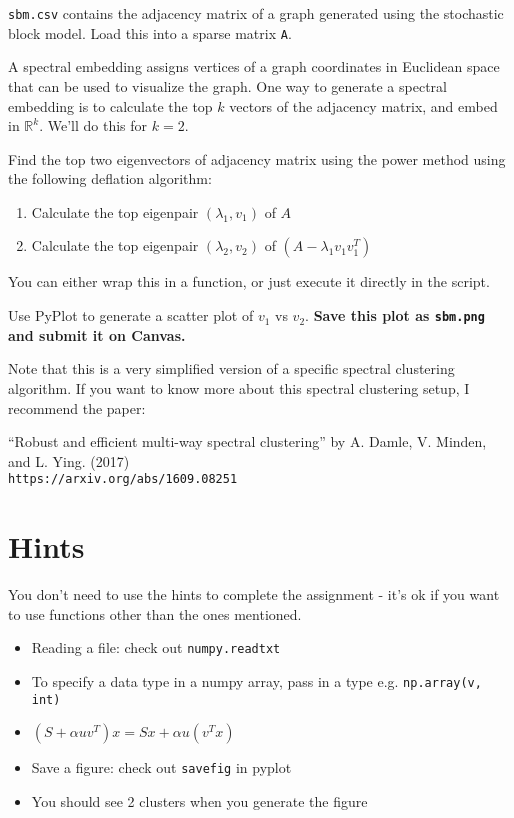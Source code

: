 \documentclass{article}
\begin{document}
{\tt sbm.csv} contains the adjacency matrix of a graph generated using the stochastic block model.  Load this into a sparse matrix {\tt A}.

A spectral embedding assigns vertices of a graph coordinates in Euclidean space that can be used to visualize the graph.  One way to generate a spectral embedding is to calculate the top $k$ vectors of the adjacency matrix, and embed in $\mathbb{R}^k$.  We'll do this for $k=2$.

Find the top two eigenvectors of adjacency matrix using the power method using the following deflation algorithm:
\begin{enumerate}
\item Calculate the top eigenpair $(\lambda_1, v_1)$ of $A$
\item Calculate the top eigenpair $(\lambda_2, v_2)$ of $(A - \lambda_1 v_1 v_1^T)$
\end{enumerate}
You can either wrap this in a function, or just execute it directly in the script.

Use PyPlot to generate a scatter plot of $v_1$ vs $v_2$.  {\bf Save this plot as {\tt sbm.png} and submit it on Canvas.}

Note that this is a very simplified version of a specific spectral clustering algorithm.  If you want to know more about this spectral clustering setup, I recommend the paper:

``Robust and efficient multi-way spectral clustering'' by A. Damle, V. Minden, and L. Ying. (2017) \\
{\tt https://arxiv.org/abs/1609.08251}




\section*{Hints}

You don't need to use the hints to complete the assignment - it's ok if you want to use functions other than the ones mentioned.

\begin{itemize}
\item Reading a file: check out {\tt numpy.readtxt}
\item To specify a data type in a numpy array, pass in a type e.g. {\tt np.array(v, int)}
\item $ (S + \alpha uv^T) x = Sx + \alpha u (v^T x)$
\item Save a figure: check out {\tt savefig} in pyplot
\item You should see 2 clusters when you generate the figure
\end{itemize}
\end{document}
